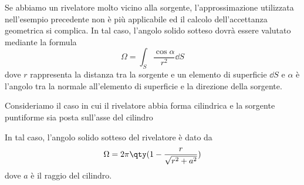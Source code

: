 \begin{esempio}\label{es:angolo_solido_riv_cilindro}
   Se abbiamo un rivelatore molto vicino alla sorgente, l'approssimazione utilizzata nell'esempio precedente non è più applicabile ed il calcolo dell'accettanza geometrica si complica. In tal caso, l'angolo solido sotteso dovrà essere valutato mediante la formula
   \begin{equation*}
      \Omega=\int_S \frac{\cos{\alpha}}{r^2} \dd{S}
   \end{equation*}
   dove $r$ rappresenta la distanza tra la sorgente e un elemento di superficie $\dd{S}$ e $\alpha$ è l'angolo tra la normale all'elemento di superficie e la direzione della sorgente.

   Consideriamo il caso in cui il rivelatore abbia forma cilindrica e la sorgente puntiforme sia posta sull'asse del cilindro
   \begin{figure}[H]
      \centering
   \end{figure}
   In tal caso, l'angolo solido sotteso del rivelatore è dato da
  \begin{equation*}
      \Omega=2\pi \qty( 1 - \frac{r}{\sqrt{r^2 + a^2}} )
  \end{equation*}
  dove $a$ è il raggio del cilindro.
\end{esempio}

